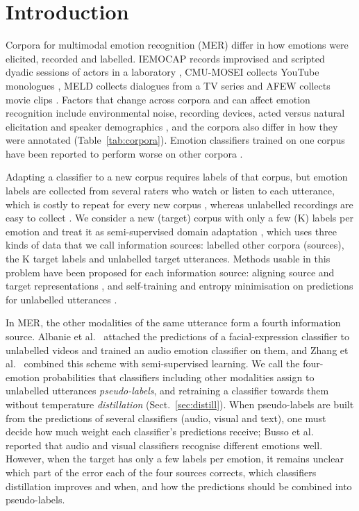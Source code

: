 \section{Introduction}\label{sec:intro}

Corpora for multimodal emotion recognition (MER) differ in how emotions were elicited, recorded and labelled. IEMOCAP records improvised and scripted dyadic sessions of actors in a laboratory \cite{busso2008iemocap}, CMU-MOSEI collects YouTube monologues \cite{zadeh2018mosei}, MELD collects dialogues from a TV series \cite{poria2019meld} and AFEW collects movie clips \cite{dhall2012afew}. Factors that change across corpora and can affect emotion recognition include environmental noise, recording devices, acted versus natural elicitation and speaker demographics \cite{gideon2021addog}, and the corpora also differ in how they were annotated (Table~\ref{tab:corpora}). Emotion classifiers trained on one corpus have been reported to perform worse on other corpora \cite{ryumina2025,gideon2021addog}.

Adapting a classifier to a new corpus requires labels of that corpus, but emotion labels are collected from several raters who watch or listen to each utterance, which is costly to repeat for every new corpus \cite{parthasarathy2020ladder,abdelwahab2018dann}, whereas unlabelled recordings are easy to collect \cite{abdelwahab2018dann}. We consider a new (target) corpus with only a few (K) labels per emotion and treat it as semi-supervised domain adaptation \cite{saito2019mme}, which uses three kinds of data that we call information sources: labelled other corpora (sources), the K target labels and unlabelled target utterances. Methods usable in this problem have been proposed for each information source: aligning source and target representations \cite{ganin2016dann,sun2016coral}, and self-training and entropy minimisation on predictions for unlabelled utterances \cite{lee2013pseudolabel,grandvalet2004,saito2019mme}.

In MER, the other modalities of the same utterance form a fourth information source. Albanie et al.\ \cite{albanie2018} attached the predictions of a facial-expression classifier to unlabelled videos and trained an audio emotion classifier on them, and Zhang et al.\ \cite{zhang2021combining} combined this scheme with semi-supervised learning. We call the four-emotion probabilities that classifiers including other modalities assign to unlabelled utterances \emph{pseudo-labels}, and retraining a classifier towards them without temperature \emph{distillation} \cite{hinton2015distilling,albanie2018} (Sect.~\ref{sec:distill}). When pseudo-labels are built from the predictions of several classifiers (audio, visual and text), one must decide how much weight each classifier's predictions receive; Busso et al.\ \cite{busso2004} reported that audio and visual classifiers recognise different emotions well. However, when the target has only a few labels per emotion, it remains unclear which part of the error each of the four sources corrects, which classifiers distillation improves and when, and how the predictions should be combined into pseudo-labels.


